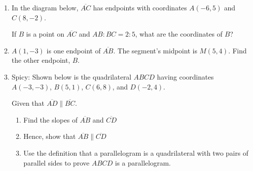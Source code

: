 \begin{enumerate}
\newpage
\item In the diagram below, $\overline{AC}$ has endpoints with coordinates $A(-6,5)$ and $C(8, -2)$.
  \begin{center} %
  \end{center}
  If $B$ is a point on $\overline{AC}$ and $AB {:} BC = 2{:}5$,  what  are  the coordinates of $B$? \vspace{4cm}
  
\item $A(1,-3)$ is one endpoint of $\overline{AB}$. The segment's midpoint is $M(5,4)$. Find the other endpoint, $B$. \vspace{3cm}

\newpage
\item Spicy: Shown below is the quadrilateral $ABCD$ having coordinates $A(-3,-3)$, $B(5,1)$, $C(6,8)$, and $D(-2,4)$.
  \begin{center} %
  \end{center}
  Given that $\overline{AD} \parallel \overline{BC}$. 
  \begin{enumerate}[itemsep=2cm]
    \item Find the slopes of $\overline{AB}$ and $\overline{CD}$\vspace{2cm}
    \item Hence, show that $\overline{AB} \parallel \overline{CD}$
    \item Use the definition that a parallelogram is a quadrilateral with two pairs of parallel sides to prove $ABCD$ is a parallelogram.
  \end{enumerate}


  
\end{enumerate}
